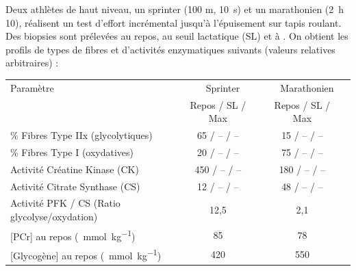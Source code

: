\documentclass[11pt]{article}
\begin{document}
\begin{exercice}
Deux athlètes de haut niveau, un sprinter (100 m, \SI{10}{\second}) et un marathonien (\SI{2}{\hour} \SI{10}{\min}), réalisent un test d'effort incrémental jusqu'à l'épuisement sur tapis roulant. Des biopsies sont prélevées au repos, au seuil lactatique (SL) et à . On obtient les profils de types de fibres et d'activités enzymatiques suivants (valeurs relatives arbitraires) :

\begin{center}
\begin{tabular}{lcccc}
\toprule
Paramètre & \multicolumn{2}{c}{Sprinter} & \multicolumn{2}{c}{Marathonien} \\
& Repos / SL / Max & & Repos / SL / Max & \\
\midrule
\% Fibres Type IIx (glycolytiques) & 65 / -- / -- & & 15 / -- / -- \\
\% Fibres Type I (oxydatives) & 20 / -- / -- & & 75 / -- / -- \\
Activité Créatine Kinase (CK) & 450 / -- / -- & & 180 / -- / -- \\
Activité Citrate Synthase (CS) & 12 / -- / -- & & 48 / -- / -- \\
Activité PFK / CS (Ratio glycolyse/oxydation) & 12,5 & & 2,1 \\
{[PCr]} au repos (\SI{}{\milli\mole\per\kilo\gram}) & 85 & & 78 \\
{[Glycogène]} au repos (\SI{}{\milli\mole\per\kilo\gram}) & 420 & & 550 \\
\bottomrule
\end{tabular}
\end{center}


\end{exercice}
\end{document}
